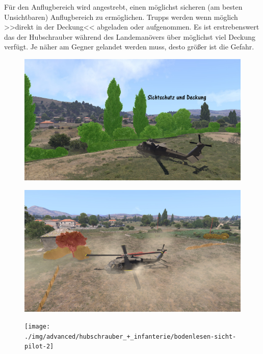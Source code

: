 	Für den Anflugbereich wird angestrebt, einen möglichst sicheren (am besten Unsichtbaren) Anflugbereich zu ermöglichen. Trupps werden wenn möglich >>direkt in der Deckung<< abgeladen oder aufgenommen. Es ist erstrebenswert das der Hubschrauber während des Landemanövers über möglichst viel Deckung verfügt. Je näher am Gegner gelandet werden muss, desto größer ist die Gefahr.
	\begin{figure}[htbp]
		\centering
		\includegraphics[width=0.95\linewidth]{./img/advanced/hubschrauber_+_infanterie/verdeckte-landung}
	\end{figure}	
	\begin{figure}[htbp]
		\centering
		\includegraphics[width=0.95\linewidth]{./img/advanced/hubschrauber_+_infanterie/bodenlesen-sicht-pilot}
	\end{figure}
	\begin{figure}[htbp]
		\centering
		\texttt{[image: ./img/advanced/hubschrauber\_+\_infanterie/bodenlesen-sicht-pilot-2]}
	\end{figure}
	
